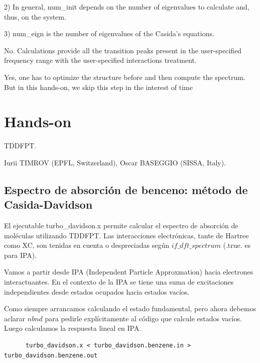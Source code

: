   2) In general, num\_init depends on the number of eigenvalues to calculate and, thus, on the system.

  3) num\_eign is the number of eigenvalues of the Casida's equations.


  No. Calculations provide all the transition peaks present in the user-specified frequency range with the user-specified interactions treatment.


  Yes, one has to optimize the structure before and then compute the spectrum. But in this hands-on, we skip this step in the interest of time

\section{Hands-on}

   TDDFPT.

  	Iurii TIMROV (EPFL, Switzerland), Oscar BASEGGIO (SISSA, Italy).

\subsection{Espectro de absorción de benceno: método de Casida-Davidson}

  El ejecutable turbo\_davidson.x permite calcular el espectro de absorción de moléculas utilizando TDDFPT. Las interacciones electrónicas, tante de Hartree como XC, son tenidas en cuenta o despreciadas según $if\_dft\_spectrum$ (.true. es para IPA).

  Vamos a partir desde IPA (Independent Particle Approxmation) hacia electrones interactuantes. En el contexto de la IPA se tiene una suma de excitaciones independientes desde estados ocupados hacia estados vacíos.

  Como siempre arrancamos calculando el estado fundamental, pero ahora debemos aclarar $nbnd$ para pedirle explícitamente al código que calcule estados vacíos. Luego calculamos la respuesta lineal en IPA.
    \begin{verbatim}
      turbo_davidson.x < turbo_davidson.benzene.in > turbo_davidson.benzene.out
    \end{verbatim}

